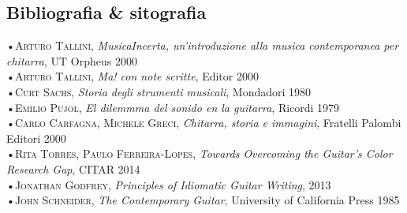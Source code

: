 \documentclass[oneside]{article}
\begin{document}
\begin{multicols*}{2}
\section{ Bibliografia \& sitografia}
•\textsc{\textsf {Arturo Tallini}}, \emph{MusicaIncerta, un'introduzione alla musica contemporanea per chitarra}, UT Orpheus 2000\\
•\textsc{\textsf {Arturo Tallini}}, \emph{Ma! con note scritte}, Editor 2000\\
•\textsc{\textsf {Curt Sachs}}, \emph{Storia degli strumenti musicali}, Mondadori 1980\\
•\textsc{\textsf {Emilio Pujol}}, \emph{El dilemmma del sonido en la guitarra}, Ricordi 1979\\
•\textsc{\textsf {Carlo Carfagna, Michele Greci}}, \emph{Chitarra, storia e immagini}, Fratelli Palombi Editori 2000\\
•\textsc{\textsf {Rita Torres, Paulo Ferreira-Lopes}}, \emph{Towards Overcoming the Guitar's Color Research Gap}, CITAR 2014\\
•\textsc{\textsf {Jonathan Godfrey}}, \emph{Principles of Idiomatic Guitar Writing},  2013\\
•\textsc{\textsf {John Schneider}}, \emph{The Contemporary Guitar},  University of California Press 1985\\

\hspace*{10mm}



\end{multicols*}
\end{document}
